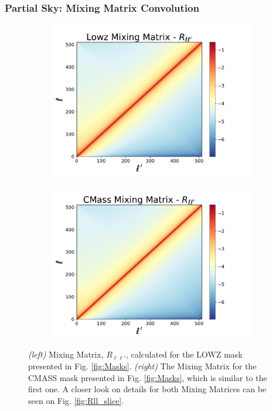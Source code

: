 \subsubsection{Partial Sky: Mixing Matrix Convolution}\label{Sec:MixingMat}
\begin{figure}
\begin{subfigure}{.5\textwidth}
  \centering
  \includegraphics[width=1.2\linewidth]{BOSS-FIGS/MixMat_LOWZ}\label{fig:LOWZ_Rll}
\end{subfigure}%
\begin{subfigure}{.5\textwidth}
  \centering
  \includegraphics[width=1.2\linewidth]{BOSS-FIGS/MixMat_CMASS}\label{fig:CMASS_Rll}
\end{subfigure}
\caption[Mixing Matrix for CMASS and LOWZ.]{\textit{(left)} Mixing Matrix, $R_{\ell \ell'}$, calculated for the LOWZ mask presented in Fig. \ref{fig:Masks}. \textit{(right)} The Mixing Matrix for the CMASS mask presented in Fig. \ref{fig:Masks}, which is similar to the first one. A closer look on details for both Mixing Matrices can be seen on Fig. \ref{fig:Rll_slice}.}
\label{fig:MixMat}
\end{figure}

